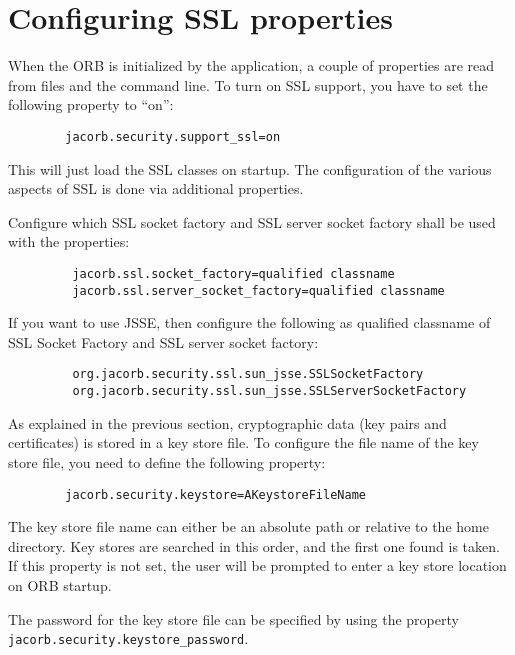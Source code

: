 \section{Configuring SSL properties}

When the ORB is initialized by the application, a couple of properties
are read from files and the  command line. To turn on SSL support, you have to
set the following property to ``on'':

\begin{verbatim}
        jacorb.security.support_ssl=on
\end{verbatim}

This will just load the SSL classes on startup. The configuration of the
various aspects of SSL is done via additional properties.

Configure which SSL socket factory and SSL server socket factory shall
be used with the properties:
\begin{verbatim}
         jacorb.ssl.socket_factory=qualified classname
         jacorb.ssl.server_socket_factory=qualified classname
\end{verbatim}

If you want to use JSSE, then configure the following as qualified
classname of SSL Socket Factory and SSL server socket factory:
\begin{verbatim}
         org.jacorb.security.ssl.sun_jsse.SSLSocketFactory
         org.jacorb.security.ssl.sun_jsse.SSLServerSocketFactory
\end{verbatim}

As explained  in the previous  section, cryptographic data  (key pairs
and  certificates) is  stored in  a  key store  file. To configure the
file name of the key store file, you need to define the following
property:

\begin{verbatim}
        jacorb.security.keystore=AKeystoreFileName
\end{verbatim}

The key store file name can either be an absolute path or relative to
the home directory. Key stores are searched in this order, and the
first one found is taken. If this property is not set, the user will be
prompted to enter a key store location on ORB startup.

The password for the key store file can be specified by using the property
{\tt jacorb.security.keystore\_password}.

